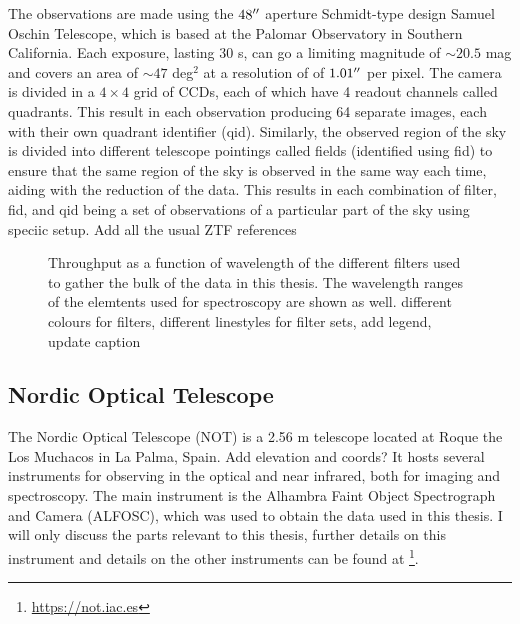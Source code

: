 \documentclass[a4paper,oneside,12pt, class=Latex/Classes/PhDthesisPSnPDF, crop=false]{standalone}
\begin{document}
The observations are made using the $48^{\prime\prime}$ aperture Schmidt-type design Samuel Oschin Telescope, which is based at the Palomar Observatory in Southern California. Each exposure, lasting 30 s, can go a limiting magnitude of $\sim20.5$ mag and covers an area of $\sim47$ deg$^2$ at a resolution of of $1.01^{\prime\prime}$ per pixel. The camera is divided in a $4\times4$ grid of CCDs, each of which have 4 readout channels called quadrants. This result in each observation producing 64 separate images, each with their own quadrant identifier (qid). Similarly, the observed region of the sky is divided into different telescope pointings called fields (identified using fid) to ensure that the same region of the sky is observed in the same way each time, aiding with the reduction of the data. This results in each combination of filter, fid, and qid being a set of observations of a particular part of the sky using speciic setup. \color{red} Add all the usual ZTF references \color{black}

\begin{figure}
    \centering
    \caption{Throughput as a function of wavelength of the different filters used to gather the bulk of the data in this thesis. The wavelength ranges of the elemtents used for spectroscopy are shown as well. \color{red} different colours for filters, different linestyles for filter sets, add legend, update caption \color{black}}
    \label{Optical_elements_plot}
\end{figure}

\subsection{Nordic Optical Telescope}
The Nordic Optical Telescope (NOT) is a 2.56 m telescope located at Roque the Los Muchacos in La Palma, Spain. \color{red} Add elevation and coords? \color{black} It hosts several instruments for observing in the optical and near infrared, both for imaging and spectroscopy. The main instrument is the Alhambra Faint Object Spectrograph and Camera (ALFOSC), which was used to obtain the data used in this thesis. I will only discuss the parts relevant to this thesis, further details on this instrument and  details on the other instruments can be found at \footnote{\url{https://not.iac.es}}.
\end{document}
